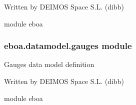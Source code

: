 Written by DEIMOS Space S.L. (dibb)

module eboa

\begin{fulllineitems}
\label{\detokenize{eboa.datamodel:eboa.datamodel.functions.get_resources_path}}
\end{fulllineitems}


\begin{fulllineitems}
\label{\detokenize{eboa.datamodel:eboa.datamodel.functions.read_configuration}}
\end{fulllineitems}



\subsubsection{eboa.datamodel.gauges module}
\label{\detokenize{eboa.datamodel:module-eboa.datamodel.gauges}}\label{\detokenize{eboa.datamodel:eboa-datamodel-gauges-module}}
Gauges data model definition

Written by DEIMOS Space S.L. (dibb)

module eboa

